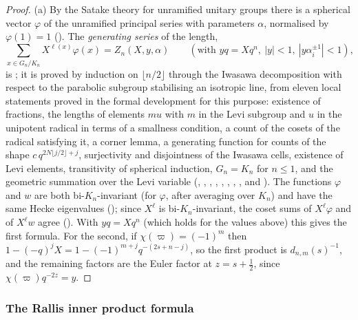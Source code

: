 \begin{proof}
(a) By the Satake theory for unramified unitary groups there is a spherical vector $\varphi$ of the unramified principal series
with parameters $\alpha$, normalised by $\varphi(1)=1$ (). The \emph{generating
series} of the length,
\[
\sum_{x\in G_n/K_n}X^{\ell(x)}\varphi(x)=Z_n(X,y,\alpha)\qquad(\text{with }yq=Xq^n,\ |y|<1,\ |y\alpha_i^{\pm1}|<1),
\]
is ; it is proved by induction on $\lfloor n/2\rfloor$ through the Iwasawa
decomposition with respect to the parabolic subgroup stabilising an isotropic line, from eleven local statements proved in the
formal development for this purpose: existence of fractions, the lengths of elements $mu$ with $m$ in the Levi subgroup and $u$
in the unipotent radical in terms of a smallness condition, a count of the cosets of the radical satisfying it, a corner lemma,
a generating function for counts of the shape $c\,q^{2N\lfloor j/2\rfloor+j}$, surjectivity and disjointness of the Iwasawa cells,
existence of Levi elements, transitivity of spherical induction, $G_n=K_n$ for $n\le1$, and the geometric summation over the
Levi variable (, , , , , , , , and ).
The functions $\varphi$ and $w$ are both bi-$K_n$-invariant (for $\varphi$, after averaging over $K_n$) and have the same Hecke
eigenvalues (); since $X^{\ell}$ is bi-$K_n$-invariant, the coset sums of $X^\ell\varphi$
and of $X^\ell w$ agree (). With $yq=Xq^n$ (which holds for
the values above) this gives the first formula. For the second, if $\chi(\varpi)=(-1)^m$ then
$1-(-q)^jX=1-(-1)^{m+j}q^{-(2s+n-j)}$, so the first product is $d_{n,m}(s)^{-1}$, and the remaining factors are the Euler factor
at $z=s+\frac12$, since $\chi(\varpi)q^{-2z}=y$.
\end{proof}

\subsubsection{The Rallis inner product formula}

